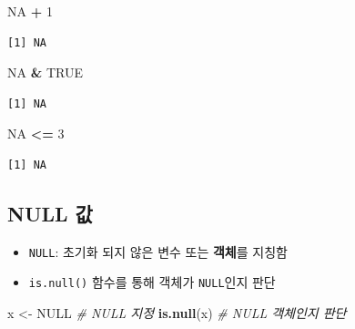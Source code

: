 \documentclass[
  11pt,
]{krantz}
\newenvironment{Shaded}{\begin{snugshade}}{\end{snugshade}}
\newcommand{\CommentTok}[1]{\textcolor[rgb]{0.37,0.37,0.37}{\textit{#1}}}
\newcommand{\DecValTok}[1]{\textcolor[rgb]{0.06,0.06,0.06}{#1}}
\newcommand{\KeywordTok}[1]{\textcolor[rgb]{0.27,0.27,0.27}{\textbf{#1}}}
\newcommand{\NormalTok}[1]{#1}
\newcommand{\OperatorTok}[1]{\textcolor[rgb]{0.43,0.43,0.43}{\textbf{#1}}}
\newcommand{\OtherTok}[1]{\textcolor[rgb]{0.37,0.37,0.37}{#1}}
\newcommand{\StringTok}[1]{\textcolor[rgb]{0.5,0.5,0.5}{#1}}
\providecommand{\tightlist}{%
  \setlength{\itemsep}{0pt}\setlength{\parskip}{0pt}}
\begin{document}
\normalsize

\footnotesize

\begin{Shaded}
\begin{Highlighting}[]
\OtherTok{NA} \OperatorTok{+}\StringTok{ }\DecValTok{1}
\end{Highlighting}
\end{Shaded}

\begin{verbatim}
[1] NA
\end{verbatim}

\begin{Shaded}
\begin{Highlighting}[]
\OtherTok{NA} \OperatorTok{&}\StringTok{ }\OtherTok{TRUE}
\end{Highlighting}
\end{Shaded}

\begin{verbatim}
[1] NA
\end{verbatim}

\begin{Shaded}
\begin{Highlighting}[]
\OtherTok{NA} \OperatorTok{<=}\StringTok{ }\DecValTok{3}
\end{Highlighting}
\end{Shaded}

\begin{verbatim}
[1] NA
\end{verbatim}

\normalsize

\hypertarget{null}{%
\subsection{NULL 값}\label{null}}

\begin{itemize}
\tightlist
\item
  \texttt{NULL}: 초기화 되지 않은 변수 또는 \textbf{객체}를 지칭함
\item
  \texttt{is.null()} 함수를 통해 객체가 \texttt{NULL}인지 판단
\end{itemize}

\footnotesize

\begin{Shaded}
\begin{Highlighting}[]
\NormalTok{x <-}\StringTok{ }\OtherTok{NULL} \CommentTok{# NULL 지정}
\KeywordTok{is.null}\NormalTok{(x) }\CommentTok{# NULL 객체인지 판단}
\end{Highlighting}
\end{Shaded}
\end{document}
